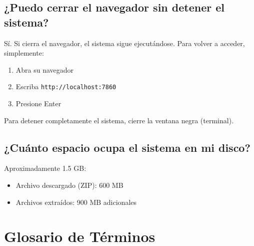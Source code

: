 \documentclass[12pt,a4paper]{article}
\begin{document}
\subsection{¿Puedo cerrar el navegador sin detener el sistema?}

Sí. Si cierra el navegador, el sistema sigue ejecutándose. Para volver a acceder, simplemente:
\begin{enumerate}[leftmargin=*]
    \item Abra su navegador
    \item Escriba \texttt{http://localhost:7860}
    \item Presione Enter
\end{enumerate}

Para detener completamente el sistema, cierre la ventana negra (terminal).

\subsection{¿Cuánto espacio ocupa el sistema en mi disco?}

Aproximadamente 1.5 GB:
\begin{itemize}[leftmargin=*]
    \item Archivo descargado (ZIP): 600 MB
    \item Archivos extraídos: 900 MB adicionales
\end{itemize}

\newpage

\section{Glosario de Términos}
\end{document}
